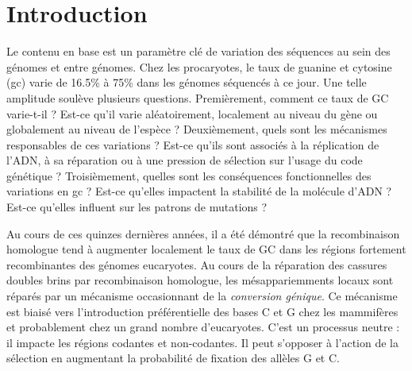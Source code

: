 
\section*{Introduction}
\label{sec:introduction}

Le contenu en base est un paramètre clé de variation des séquences au sein des
génomes et entre génomes. Chez les procaryotes, le taux de guanine et cytosine
(\ac{gc}) varie de 16.5\% à 75\% dans les génomes séquencés à ce jour. Une
telle amplitude soulève plusieurs questions. Premièrement, comment ce taux de
GC varie-t-il ? Est-ce qu'il varie aléatoirement, localement au niveau du gène
ou globalement au niveau de l'espèce ? Deuxièmement, quels sont les mécanismes
responsables de ces variations ? Est-ce qu'ils sont associés à la réplication
de l'ADN, à sa réparation ou à une pression de sélection sur l'usage du code
génétique ?  Troisièmement, quelles sont les conséquences fonctionnelles des
variations en \ac{gc} ? Est-ce qu'elles impactent la stabilité de la molécule
d'ADN ?  Est-ce qu'elles influent sur les patrons de mutations ?

Au cours de ces quinzes dernières années, il a été démontré que la
recombinaison homologue tend à augmenter localement le taux de GC dans les
régions fortement recombinantes des génomes
eucaryotes\cite{duret_biased_2009,lesecque_gc-biased_2013}. Au cours de la
réparation des cassures doubles brins par recombinaison homologue, les
mésappariemments locaux sont réparés par un mécanisme occasionnant de la
\emph{conversion génique}\cite{chen_gene_2007}. Ce mécanisme est biaisé vers
l'introduction préférentielle des bases C et G chez les mammifères et
probablement chez un grand nombre d'eucaryotes\cite{pessia_evidence_2012}.
C'est un processus neutre : il impacte les régions codantes et non-codantes. Il
peut s'opposer à l'action de la sélection en augmentant la probabilité de
fixation des allèles G et C\cite{ratnakumar_detecting_2010}.

